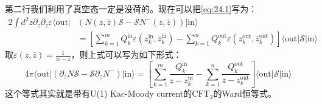 第二行我们利用了真空态一定是没荷的。现在可以把\ref{eq:24.1}写为：
\begin{equation}
	\begin{aligned}
		2\int d^2z\partial_z\partial_{\bar{z}}\varepsilon\langle\text{out}|&\left(N(z,\bar{z})\mathcal{S}-\mathcal{S}N^-(z,\bar{z})\right)|\text{in}\rangle\\&=\left[\sum_{k=1}^mQ_k^\text{in}\varepsilon(z_k^\text{in},\bar{z}_k^\text{in})-\sum_{k=1}^nQ_k^\text{out}\varepsilon(z_k^\text{out},{\bar{z}}_k^\text{out})\right]\langle\text{out}|\mathcal{S}|\text{in}\rangle
	\end{aligned}
\end{equation}
取$\varepsilon(z,\bar z)=\frac{1}{w-z}$，则上式可以写为如下形式：
\begin{equation}\label{eq:24.5}
	4\pi\langle\mathrm{out}|\left(\partial_zN\mathcal{S}-\mathcal{S}\partial_zN^-\right)|\mathrm{in}\rangle=\left[\sum_{k=1}^m\frac{Q_k^\mathrm{in}}{z-z_k^\mathrm{in}}-\sum_{k=1}^n\frac{Q_k^\mathrm{out}}{z-z_k^\mathrm{out}}\right]\langle\mathrm{out}|\mathcal{S}|\mathrm{in}\rangle 
\end{equation}
这个等式其实就是带有U(1) K$\breve{\text{a}}$c-Moody current的$\text{CFT}_2$的Ward恒等式\cite{Blumenhagen:2009zz,He:2015zea,Strominger:2013lka,Nande:2017dba}。
